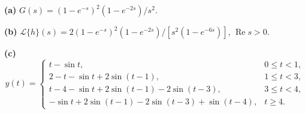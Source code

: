 \noindent\textbf{(a)} $G(s)=(1-e^{-s})^2(1-e^{-2s})/s^2$.

\noindent\textbf{(b)} $\mathcal L\{h\}(s)=2(1-e^{-s})^2(1-e^{-2s})/[s^2(1-e^{-6s})]$, $\operatorname{Re}s>0$.

\noindent\textbf{(c)} \[y(t)=\begin{cases}t-\sin t,&0\le t<1,\\2-t-\sin t+2\sin(t-1),&1\le t<3,\\t-4-\sin t+2\sin(t-1)-2\sin(t-3),&3\le t<4,\\-\sin t+2\sin(t-1)-2\sin(t-3)+\sin(t-4),&t\ge4.\end{cases}\]
